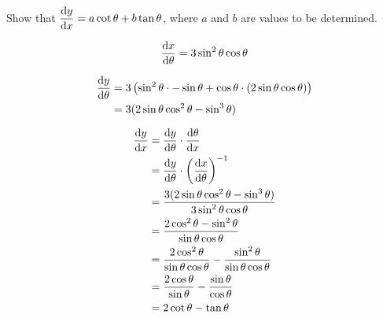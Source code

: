\documentclass{echw}
\begin{document}
        Show that $\dfrac{\mathrm{d} y}{\mathrm{d} x} = a\cot \theta + b\tan \theta$, where $a$ and $b$ are values to be determined.

    \solution
        \begin{equation*}
            \dfrac{\mathrm{d} x}{\mathrm{d} \theta} = 3\sin^2\theta\cos\theta
        \end{equation*}

        \begin{align*}
            \dfrac{\mathrm{d} y}{\mathrm{d} \theta} &= 3\left(\sin^2\theta \cdot -\sin\theta + \cos\theta \cdot (2\sin\theta\cos\theta) \right)\\
            &= 3(2\sin\theta\cos^2\theta-\sin^3\theta)
        \end{align*}

        \begin{align*}
            \dfrac{\mathrm{d} y}{\mathrm{d} x} &= \dfrac{\mathrm{d} y}{\mathrm{d} \theta} \cdot \dfrac{\mathrm{d} \theta}{\mathrm{d} x}\\
            &= \dfrac{\mathrm{d} y}{\mathrm{d} \theta} \cdot \left(\dfrac{\mathrm{d} x}{\mathrm{d} \theta}\right)^{-1}\\
            &= \dfrac{3(2\sin\theta\cos^2\theta-\sin^3\theta)}{3\sin^2\theta\cos\theta}\\
            &= \dfrac{2\cos^2\theta-\sin^2\theta}{\sin\theta\cos\theta}\\
            &= \dfrac{2\cos^2\theta}{\sin\theta\cos\theta} - \dfrac{\sin^2\theta}{\sin\theta\cos\theta}\\
            &= \dfrac{2\cos\theta}{\sin\theta} - \dfrac{\sin\theta}{\cos\theta}\\
            &= 2\cot\theta - \tan\theta
        \end{align*}

\end{document}
